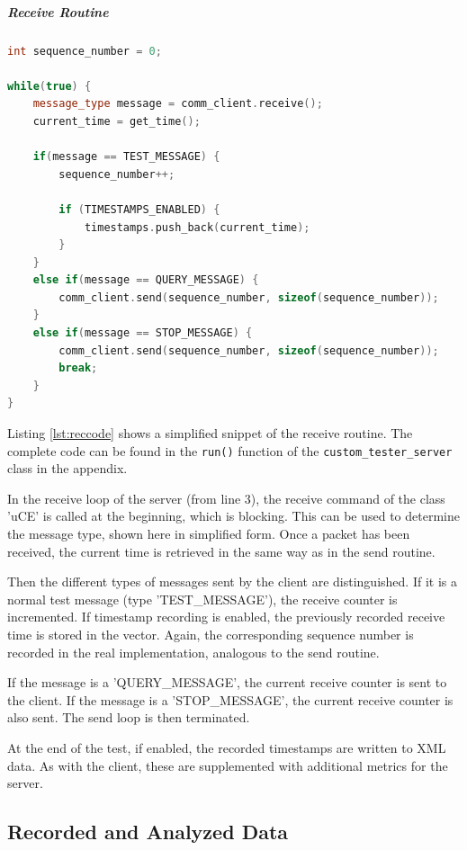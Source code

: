 \subparagraph{Receive Routine}

\begin{lstlisting}[language=C++, caption=Simplified Code of the Receive Routine., label=lst:reccode]
int sequence_number = 0;

while(true) {
    message_type message = comm_client.receive();
    current_time = get_time();

    if(message == TEST_MESSAGE) {
        sequence_number++;

        if (TIMESTAMPS_ENABLED) {
            timestamps.push_back(current_time);
        }
    }
    else if(message == QUERY_MESSAGE) {
        comm_client.send(sequence_number, sizeof(sequence_number));
    }
    else if(message == STOP_MESSAGE) {
        comm_client.send(sequence_number, sizeof(sequence_number));
        break;
    }
}
\end{lstlisting}

Listing \ref{lst:reccode} shows a simplified snippet of the receive routine. The complete code can be found in the \texttt{run()} function of the \texttt{custom\_tester\_server} class in the appendix.

In the receive loop of the server (from line 3), the receive command of the class 'uCE' is called at the beginning, which is blocking. This can be used to determine the message type, shown here in simplified form. Once a packet has been received, the current time is retrieved in the same way as in the send routine.

Then the different types of messages sent by the client are distinguished. If it is a normal test message (type 'TEST\_MESSAGE'), the receive counter is incremented. If timestamp recording is enabled, the previously recorded receive time is stored in the vector. Again, the corresponding sequence number is recorded in the real implementation, analogous to the send routine.

If the message is a 'QUERY\_MESSAGE', the current receive counter is sent to the client. If the message is a 'STOP\_MESSAGE', the current receive counter is also sent. The send loop is then terminated.

At the end of the test, if enabled, the recorded timestamps are written to XML data. As with the client, these are supplemented with additional metrics for the server.


\subsection{Recorded and Analyzed Data} \label{chap:evaluationTS} 

